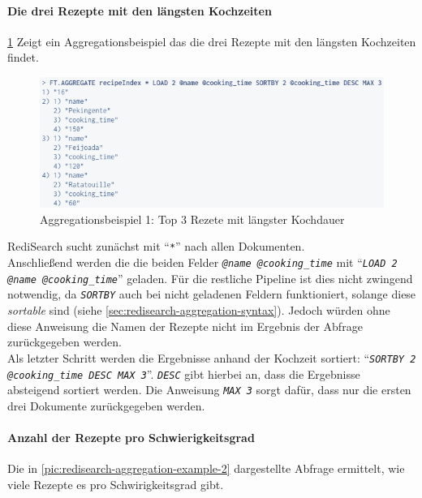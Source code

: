 \paragraph{Die drei Rezepte mit den längsten Kochzeiten}
\cref{pic:redisearch-aggregation-example-1} Zeigt ein Aggregationsbeispiel das die drei Rezepte mit den längsten Kochzeiten findet.\\
\begin{figure}[!h]  %
    \centering      %
    \includegraphics[width=1\textwidth]{pictures/redis/redisearch_aggregation_example_1.png}
    \caption{Aggregationsbeispiel 1: Top 3 Rezete mit längster Kochdauer}      %
    \label{pic:redisearch-aggregation-example-1}    %
\end{figure}

RediSearch sucht zunächst mit \enquote{\emph{\texttt{*}}} nach allen Dokumenten.\\
Anschließend werden die die beiden Felder \emph{\texttt{@name @cooking\_time}} mit \enquote{\emph{\texttt{LOAD 2 @name @cooking\_time}}}  geladen. Für die restliche Pipeline ist dies nicht zwingend notwendig, da \emph{\texttt{SORTBY}} auch bei nicht geladenen Feldern funktioniert, solange diese \emph{sortable} sind (siehe \ref{sec:redisearch-aggregation-syntax}). Jedoch würden ohne diese Anweisung die Namen der Rezepte nicht im Ergebnis der Abfrage zurückgegeben werden.\\
Als letzter Schritt werden die Ergebnisse anhand der Kochzeit sortiert: \enquote{\emph{\texttt{SORTBY 2 @cooking\_time DESC MAX 3}}}. \emph{\texttt{DESC}} gibt hierbei an, dass die Ergebnisse absteigend sortiert werden. Die Anweisung \emph{\texttt{MAX 3}} sorgt dafür, dass nur die ersten drei Dokumente zurückgegeben werden.


\paragraph{Anzahl der Rezepte pro Schwierigkeitsgrad}
Die in \cref{pic:redisearch-aggregation-example-2} dargestellte Abfrage ermittelt, wie viele Rezepte es pro Schwirigkeitsgrad gibt.

